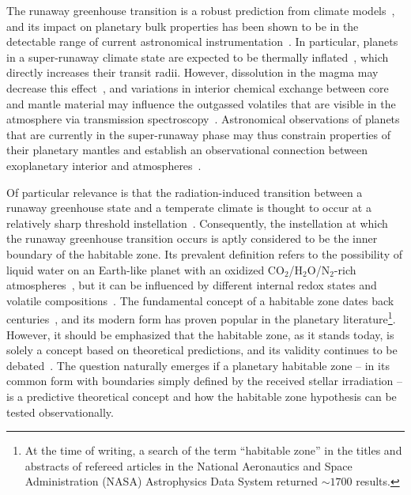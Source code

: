 \documentclass[twocolumn,twocolappendix]{aastex631}
\begin{document}
The runaway greenhouse transition is a robust prediction from climate models~\citep{Forget2014,Boukrouche2021,2022A&A...658A..40C}, and its impact on planetary bulk properties has been shown to be in the detectable range of current astronomical instrumentation~\citep{Goldblatt2015}.
In particular, planets in a super-runaway climate state are expected to be thermally inflated~\citep{Turbet2019,Turbet2020,Mousis2020}, which directly increases their transit radii.
However, dissolution in the magma may decrease this effect~\citep{Dorn2021}, and variations in interior chemical exchange between core and mantle material may influence the outgassed volatiles that are visible in the atmosphere via transmission spectroscopy~\citep{2021ApJ...914L...4L,2022PSJ.....3..127S}.
Astronomical observations of planets that are currently in the super-runaway phase may thus constrain properties of their planetary mantles and establish an observational connection between exoplanetary interior and atmospheres~\citep{2022arXiv220310023L,Wordsworth2022}.


Of particular relevance is that the radiation-induced transition between a runaway greenhouse state and a temperate climate is thought to occur at a relatively sharp threshold instellation~\citep{2010ppc..book.....P,2013ApJ...765..131K}.
Consequently, the instellation at which the runaway greenhouse transition occurs is aptly considered to be the inner boundary of the habitable zone.
Its prevalent definition refers to the possibility of liquid water on an Earth-like planet with an oxidized CO$_2$/H$_2$O/N$_2$-rich atmospheres~\citep[][]{Kasting1993,Kopparapu2013,Kopparapu2014}, but it can be influenced by different internal redox states and volatile compositions~\citep{2011ApJ...734L..13P,2017ApJ...837L...4R,2018ApJ...858...72R,2019ApJ...875...31K,2020ApJ...896..115G,2022JGRE..12707456G,2023ApJ...942L..20H}.
The fundamental concept of a habitable zone dates back centuries~\citep{Newton1687,Whewell1858,Shapley1953,Huang1959}, and its modern form has proven popular in the planetary literature\footnote{At the time of writing, a search of the term ``habitable zone'' in the titles and abstracts of refereed articles in the National Aeronautics and Space Administration (NASA) Astrophysics Data System returned $\sim\num{1700}$ results.}.
However, it should be emphasized that the habitable zone, as it stands today, is solely a concept based on theoretical predictions, and its validity continues to be debated~\citep[e.g.,][]{Cockell2016,Moore2017,Tuchow2023}.
The question naturally emerges if a planetary habitable zone -- in its common form with boundaries simply defined by the received stellar irradiation -- is a predictive theoretical concept and how the habitable zone hypothesis can be tested observationally.
\end{document}
